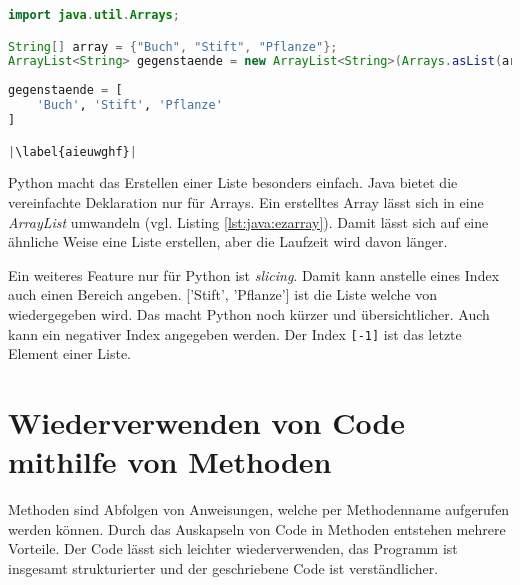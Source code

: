 \begin{minipage}{.5\linewidth}
\begin{lstlisting}[language=java,caption={Einfache Deklarierung Java},captionpos=b,label={lst:java:ezarray},frame=none]
import java.util.Arrays;

String[] array = {"Buch", "Stift", "Pflanze"};
ArrayList<String> gegenstaende = new ArrayList<String>(Arrays.asList(array));
\end{lstlisting}
\end{minipage}
\begin{minipage}{.5\linewidth}
\begin{lstlisting}[language=python,caption={Einfach Deklarierung Python},captionpos=b,label={lst:python:ezarray},frame=l,escapechar=|]
gegenstaende = [
    'Buch', 'Stift', 'Pflanze'
]

|\label{aieuwghf}|
\end{lstlisting}
\end{minipage}

Python macht das Erstellen einer Liste besonders einfach. Java bietet die vereinfachte Deklaration nur für Arrays. Ein erstelltes Array lässt sich in eine \textit{ArrayList} umwandeln (vgl. Listing \ref{lst:java:ezarray}). Damit lässt sich auf eine ähnliche Weise eine Liste erstellen, aber die Laufzeit wird davon länger.

Ein weiteres Feature nur für Python ist \textit{slicing}. Damit kann anstelle eines Index auch einen Bereich angeben. ['Stift', 'Pflanze'] ist die Liste welche von  wiedergegeben wird. Das macht Python noch kürzer und übersichtlicher. Auch kann ein negativer Index angegeben werden. Der Index \texttt{[-1]} ist das letzte Element einer Liste.\par

\section{Wiederverwenden von Code mithilfe von Methoden}
Methoden sind Abfolgen von Anweisungen, welche per Methodenname aufgerufen werden können. Durch das Auskapseln von Code in Methoden entstehen mehrere Vorteile. Der Code lässt sich leichter wiederverwenden, das Programm ist insgesamt strukturierter und der geschriebene Code ist verständlicher. \cite{Louis:2010}\cite{Python3:Buch}

